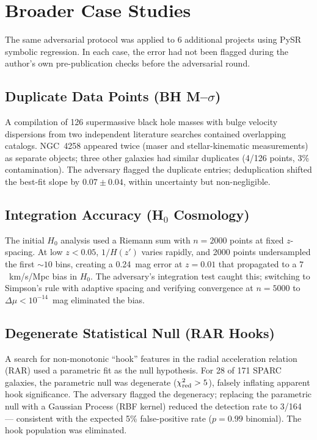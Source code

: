 \documentclass[twocolumn]{aastex631}
\begin{document}
\section{Broader Case Studies}
\label{sec:casestudies}

The same adversarial protocol was applied to 6 additional projects
using PySR symbolic regression.  In each case, the error had not been flagged during the author's own
pre-publication checks before the adversarial round.

\subsection{Duplicate Data Points (BH M--$\sigma$)}
A compilation of 126 supermassive black hole masses with bulge
velocity dispersions from two independent literature searches
contained overlapping catalogs.  NGC~4258 appeared twice (maser and
stellar-kinematic measurements) as separate objects; three other
galaxies had similar duplicates (4/126 points, 3\% contamination).
The adversary flagged the duplicate entries; deduplication shifted the
best-fit slope by $0.07\pm0.04$, within uncertainty but non-negligible.

\subsection{Integration Accuracy (H$_0$ Cosmology)}
The initial $H_0$ analysis used a Riemann sum with $n=2000$ points at
fixed $z$-spacing.  At low $z<0.05$, $1/H(z')$ varies rapidly, and
2000 points undersampled the first $\sim10$ bins, creating a
0.24~mag error at $z=0.01$ that propagated to a $7$~km/s/Mpc bias in
$H_0$.  The adversary's integration test caught this; switching to
Simpson's rule with adaptive spacing and verifying convergence at
$n=5000$ to $\Delta\mu<10^{-14}$~mag eliminated the bias.

\subsection{Degenerate Statistical Null (RAR Hooks)}
A search for non-monotonic ``hook'' features in the radial
acceleration relation (RAR) used a parametric fit as the null
hypothesis.  For 28 of 171 SPARC galaxies, the parametric null was
degenerate ($\chi^2_{\rm red}>5$), falsely inflating apparent hook
significance.  The adversary flagged the degeneracy; replacing the
parametric null with a Gaussian Process (RBF kernel) reduced the
detection rate to 3/164 --- consistent with the expected 5\%
false-positive rate ($p=0.99$ binomial).  The hook population was
eliminated.
\end{document}
